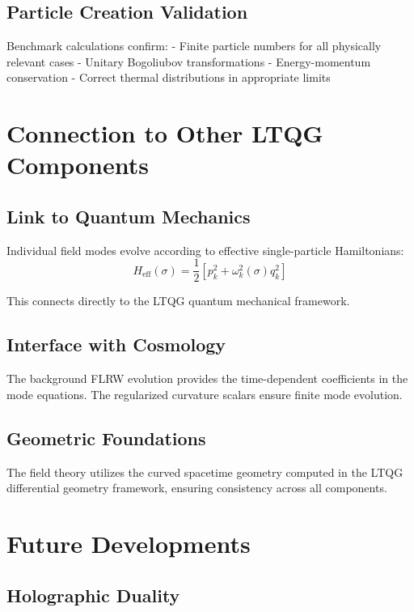 \documentclass[11pt,a4paper]{article}
\begin{document}
\subsection{Particle Creation Validation}

Benchmark calculations confirm:
- Finite particle numbers for all physically relevant cases
- Unitary Bogoliubov transformations
- Energy-momentum conservation
- Correct thermal distributions in appropriate limits

\section{Connection to Other LTQG Components}

\subsection{Link to Quantum Mechanics}

Individual field modes evolve according to effective single-particle Hamiltonians:
\begin{equation}
H_{\text{eff}}(\sigma) = \frac{1}{2}\left[p_k^2 + \omega_k^2(\sigma) q_k^2\right]
\end{equation}

This connects directly to the LTQG quantum mechanical framework.

\subsection{Interface with Cosmology}

The background FLRW evolution provides the time-dependent coefficients in the mode equations. The regularized curvature scalars ensure finite mode evolution.

\subsection{Geometric Foundations}

The field theory utilizes the curved spacetime geometry computed in the LTQG differential geometry framework, ensuring consistency across all components.

\section{Future Developments}

\subsection{Holographic Duality}
\end{document}
